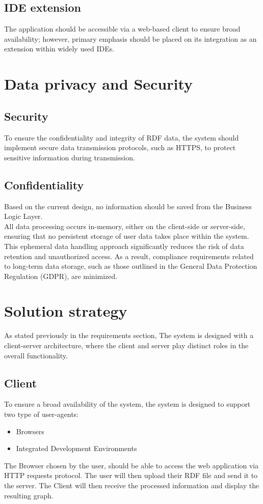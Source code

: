 \subsection{IDE extension\label{sec:reqsuba}}
The application should be accessible via a web-based client to ensure broad availability; however, primary emphasis should be placed on its integration as an extension within widely used IDEs. 

\section{Data privacy and Security\label{sec:techreq}}
\subsection{Security\label{sec:reqsuba}}
To ensure the confidentiality and integrity of RDF data, the system should implement secure data transmission protocols, such as HTTPS, to protect sensitive information during transmission.

\subsection{Confidentiality\label{sec:reqsuba}}
Based on the current design, no information should be saved from the Business Logic Layer. 
\\
All data processing occurs in-memory, either on the client-side or server-side, ensuring that no persistent storage of user data takes place within the system. This ephemeral data handling approach significantly reduces the risk of data retention and unauthorized access. As a result, compliance requirements related to long-term data storage, such as those outlined in the General Data Protection Regulation (GDPR), are minimized. 


\section{Solution strategy\label{sec:techreq}}
As stated previously in the requirements section, The system is designed with a client-server architecture, where the client and server play distinct roles in the overall functionality.

\subsection{Client\label{sec:reqsuba}}
To ensure a broad availability of the system, the system is designed to support two type of user-agents:
\begin{itemize}
    \item Browsers
    \item Integrated Development Environments 
\end{itemize}
The Browser chosen by the user, should be able to access the web application via HTTP requests protocol.
The user will then upload their RDF file and send it to the server.
The Client will then receive the processed information and display the resulting graph.

